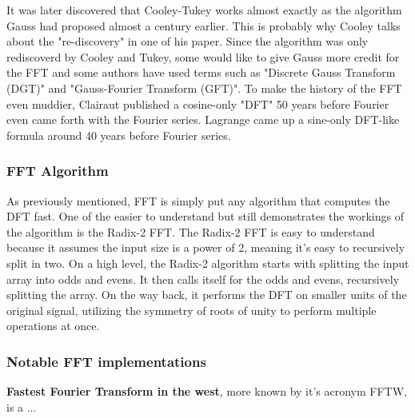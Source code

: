 
It was later discovered that Cooley-Tukey works almost exactly as the algorithm Gauss had proposed almost a century earlier. This is probably why Cooley talks about the "re-discovery" in one of his paper. Since the algorithm was only rediscoverd by Cooley and Tukey, some would like to give Gauss more credit for the FFT and some authors have used terms such as "Discrete Gauss Transform (DGT)" and "Gauss-Fourier Transform (GFT)". To make the history of the FFT even muddier, Clairaut published a cosine-only "DFT" 50 years before Fourier even came forth with the Fourier series. Lagrange came up a sine-only DFT-like formula around 40 years before Fourier series.







\subsubsection{FFT Algorithm}
As previously mentioned, FFT is simply put any algorithm that computes the DFT fast. One of the easier to understand but still demonstrates the workings of the algorithm is the Radix-2 FFT. The Radix-2 FFT is easy to understand because it assumes the input size is a power of 2, meaning it's easy to recursively split in two. On a high level, the Radix-2 algorithm starts with splitting the input array into odds and evens. It then calls itself for the odds and evens, recursively splitting the array. On the way back, it performs the DFT on smaller units of the original signal, utilizing the symmetry of roots of unity to perform multiple operations at once.

\subsubsection{Notable FFT implementations}
\textbf{Fastest Fourier Transform in the west}, more known by it's acronym FFTW, is a ...





